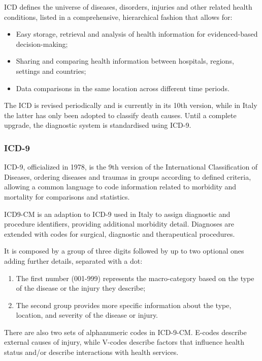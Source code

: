 ICD defines the universe of diseases, disorders, injuries and other related health conditions, listed in a comprehensive, hierarchical fashion that allows for: 
\begin{itemize}
	\item Easy storage, retrieval and analysis of health information for evidenced-based decision-making;
	\item Sharing and comparing health information between hospitals, regions, settings and countries;
	\item Data comparisons in the same location across different time periods\cite{whoicd}.
\end{itemize}

The ICD is revised periodically and is currently in its 10th version, while in Italy the latter has only been adopted to classify death causes\cite{icdit}. Until a complete upgrade, the diagnostic system is standardised using ICD-9.

\subsubsection{ICD-9}
ICD-9, officialized in 1978, is the 9th version of the International Classification of Diseases, ordering diseases and traumas in groups according to defined criteria, allowing a common language to code information related to morbidity and mortality for comparisons and statistics\cite{icdit}.

ICD9-CM is an adaption to ICD-9 used in Italy to assign diagnostic and procedure identifiers, providing additional morbidity detail. Diagnoses are extended with codes for surgical, diagnostic and therapeutical procedures. 

It is composed by a group of three digits followed by up to two optional ones adding further details, separated with a dot:
\begin{enumerate}
	\item The first number (001-999) represents the macro-category based on the type of the disease or the injury they describe;
	\item The second group provides more specific information about the type, location, and severity of the disease or injury.
\end{enumerate}

There are also two sets of alphanumeric codes in ICD-9-CM. E-codes describe external causes of injury, while V-codes describe factors that influence health status and/or describe interactions with health services\cite{icd9en}.

